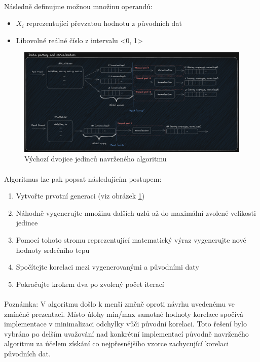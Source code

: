 \documentclass[12pt, a4paper]{article}
\begin{document}
\paragraph{} Následně definujme možnou množinu operandů: 

\begin{itemize}
    \item $X_i$ reprezentující převzatou hodnotu z původních dat
    \item Libovolné reálné číslo z intervalu <0, 1>
\end{itemize}

\begin{figure}
  \includegraphics[width=\linewidth]{assets/ppr_diagram_p2.png}
  \caption{Výchozí dvojice jedinců navrženého algoritmu}
  \label{fig-starting-generation}
\end{figure}

\paragraph{} Algoritmus lze pak popsat následujícím postupem:

\begin{enumerate}
  \item Vytvořte prvotní generaci (viz obrázek \ref{fig-starting-generation})
  \item Náhodně vygenerujte množinu dalších uzlů až do maximální zvolené velikosti jedince
  \item Pomocí tohoto stromu reprezentující matematický výraz vygenerujte nové hodnoty srdečního tepu
  \item Spočítejte korelaci mezi vygenerovanými a původními daty 
  \item Pokračujte krokem dva po zvolený počet iterací
\end{enumerate}

\paragraph{} Poznámka: V algoritmu došlo k menší změně oproti návrhu uvedenému ve zmíněné prezentaci. 
Místo úlohy min/max samotné hodnoty korelace spočívá implementace v minimalizaci odchylky vůči původní korelaci.
Toto řešení bylo vybráno po delším uvažování nad konkrétní implementací původně navrženého algoritmu za účelem získání co nejpřesnějšího vzorce zachycující korelaci původních dat.
\end{document}
